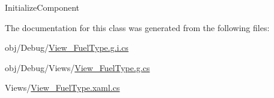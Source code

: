 Initialize\+Component 



The documentation for this class was generated from the following files\+:\begin{DoxyCompactItemize}
\item 
obj/\+Debug/\mbox{\hyperlink{_view___fuel_type_8g_8i_8cs}{View\+\_\+\+Fuel\+Type.\+g.\+i.\+cs}}\item 
obj/\+Debug/\+Views/\mbox{\hyperlink{_view___fuel_type_8g_8cs}{View\+\_\+\+Fuel\+Type.\+g.\+cs}}\item 
Views/\mbox{\hyperlink{_view___fuel_type_8xaml_8cs}{View\+\_\+\+Fuel\+Type.\+xaml.\+cs}}\end{DoxyCompactItemize}
